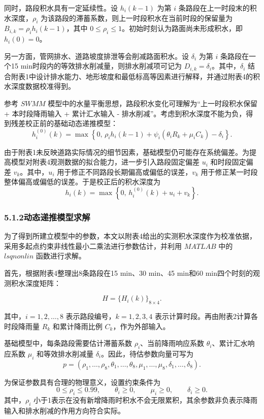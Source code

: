 \documentclass[UTF8,a4paper,12pt]{ctexart}
\begin{document}
同时，路段积水具有一定延续性。设 \(h_i(k-1)\) 为第 \(i\) 条路段在上一时段末的积水深度，\(\rho_i\) 为该路段的滞蓄系数，则上一时段积水在当前时段的保留量为 \(B_{i,k}=\rho_i h_i(k-1)\)，其中 \(0\leq\rho_i\leq1\)。初始时刻认为路面尚未形成积水，即 \(h_i(0)=0\)。

另一方面，管网排水、道路坡度排泄等会削减路面积水。设 \(\delta_i\) 为第 \(i\) 条路段在一个15 min时段内的等效排水削减量，则排水削减项可记为 \(D_{i,k}=\delta_i\)。其中，\(\delta_i\) 结合附表1中设计排水能力、地形坡度和最低标高等因素进行解释，并通过附表4的积水深度数据校准得到。

参考 \(SWMM\) 模型中的水量平衡思想，路段积水变化可理解为“上一时段积水保留 + 本时段降雨输入 + 累计汇水输入 - 排水削减”。考虑到积水深度不能为负，得到残差校正前的基础动态递推模型：
\[
h_i^{(0)}(k)=
\max\left\{
0,\,
\rho_i h_i(k-1)
+\psi_i\left(\theta_iR_k+\mu_iC_k\right)
-\delta_i
\right\}.
\]

由于附表1未反映道路实际情况的细节因素，基础模型仍可能存在系统偏差。为提高模型对附表4观测数据的拟合能力，进一步引入路段固定偏差 \(u_i\) 和时段固定偏差 \(v_k\)。其中，\(u_i\) 用于修正不同路段长期偏高或偏低的误差，\(v_k\) 用于修正某一时段整体偏高或偏低的误差。于是校正后的积水深度为
\[
h_i(k)=
\max\left\{
0,\,
h_i^{(0)}(k)+u_i+v_k
\right\}.
\]

\subsubsection{5.1.2动态递推模型求解}

为了得到所建立模型中的参数，本文以附表4给出的实测积水深度作为校准依据，采用多起点约束非线性最小二乘法进行参数估计，并利用 $MATLAB$ 中的 $lsqnonlin$ 函数进行求解。

首先，根据附表4整理出8条路段在15 min、30 min、45 min和60 min四个时刻的观测积水深度矩阵：

\[
H=\{H_i(k)\}_{8\times 4}.
\]

其中，\(i=1,2,\ldots,8\) 表示路段编号，\(k=1,2,3,4\) 表示计算时段。再由附表2计算各时段降雨量 \(R_k\) 和累计降雨比例 \(C_k\)，作为外部输入。

基础模型中，每条路段需要估计滞蓄系数 \(\rho_i\)、当前降雨响应系数 \(\theta_i\)、累计汇水响应系数 \(\mu_i\) 和等效排水削减量 \(\delta_i\)。因此，待估参数向量可写为
\[
p=(\rho_1,\ldots,\rho_8,\theta_1,\ldots,\theta_8,
\mu_1,\ldots,\mu_8,\delta_1,\ldots,\delta_8).
\]

为保证参数具有合理的物理意义，设置约束条件为
\[
0\leq \rho_i\leq 0.99,\qquad
\theta_i\geq 0,\qquad
\mu_i\geq 0,\qquad
\delta_i\geq 0.
\]
其中，\(\rho_i\) 小于1表示在没有新增降雨时积水不会无限累积，其余参数非负表示降雨输入和排水削减的作用方向符合实际。
\end{document}
